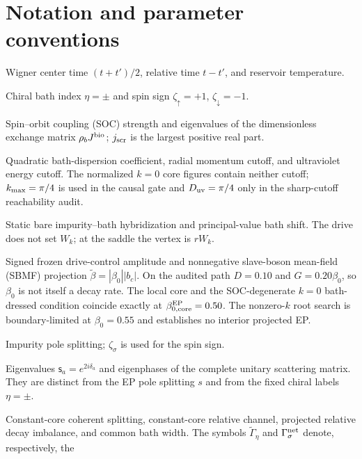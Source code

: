 \documentclass[%
  aps,prb,reprint,amsmath,amssymb,superscriptaddress,longbibliography,floatfix
]{revtex4-2}
\begin{document}
\section*{Notation and parameter conventions}
\begin{description}[leftmargin=1.6cm,style=nextline]
\item[$t_{\rm av},\tau,T_{\rm b}$]
Wigner center time $(t+t')/2$, relative time $t-t'$, and reservoir temperature.
\item[$\eta,\zeta_\sigma$]
Chiral bath index $\eta=\pm$ and spin sign $\zeta_\uparrow=+1$, $\zeta_\downarrow=-1$.
\item[$\lambda,j_\alpha$]
Spin--orbit coupling (SOC) strength and eigenvalues of the dimensionless exchange matrix $\rho_bJ^{\rm bio}$; $j_{\rm scr}$ is the largest positive real part.
\item[$\alpha_{\rm b},k_{\rm max},D_{\rm uv}$]
Quadratic bath-dispersion coefficient, radial momentum cutoff, and ultraviolet
energy cutoff.  The normalized $k=0$ core figures contain neither cutoff;
$k_{\rm max}=\pi/4$ is used in the causal gate and
$D_{\rm uv}=\pi/4$ only in the sharp-cutoff reachability audit.
\item[$W_k,W,\Lambda_\eta^{\rm PV}$]
Static bare impurity--bath hybridization and principal-value bath shift.
The drive does not set $W_k$; at the saddle the vertex is $rW_k$.
\item[$\beta_0,\tilde\beta$]
Signed frozen drive-control amplitude and nonnegative slave-boson mean-field
(SBMF) projection $\tilde\beta=|\beta_0||b_c|$.  On the audited path
$D=0.10$ and $G=0.20\beta_0$, so $\beta_0$ is not itself a decay rate.
The local core and the SOC-degenerate $k=0$ bath-dressed condition coincide
exactly at $\beta_{0,{\rm core}}^{\rm EP}=0.50$.  The nonzero-$k$ root search
is boundary-limited at $\beta_0=0.55$ and establishes no interior projected
EP.
\item[$s$]
Impurity pole splitting; $\zeta_\sigma$ is used for the spin sign.
\item[$\mathsf{s}_a,\delta_a$]
Eigenvalues $\mathsf{s}_a=e^{2i\delta_a}$ and eigenphases of the complete
unitary scattering matrix.  They are distinct from the EP pole splitting
$s$ and from the fixed chiral labels $\eta=\pm$.
\item[$D,G,\Gamma_{\rm PT},\bar\Gamma$]
Constant-core coherent splitting, constant-core relative channel, projected
relative decay imbalance, and common bath width.  The symbols
$\tilde\Gamma_\eta$ and $\Gamma_\sigma^{\rm net}$ denote, respectively, the

\end{description}
\end{document}
